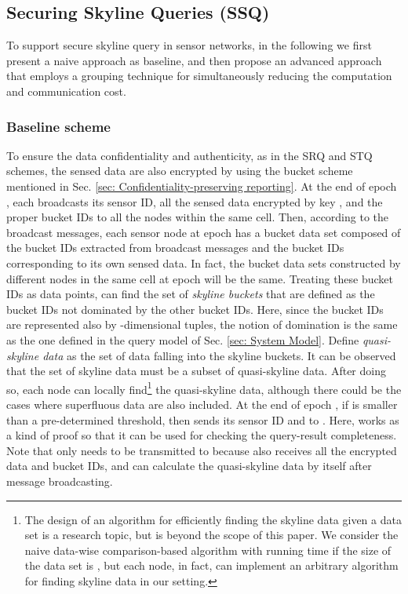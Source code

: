\documentclass[conference]{IEEEtran}
\begin{document}
\subsection{Securing Skyline Queries (SSQ)}\label{sec: Securing Skyline Queries (SSQ)}
To support secure skyline query in sensor networks, in the following we first present a naive approach as baseline, and then propose an advanced approach that employs a grouping technique for simultaneously reducing the computation and communication cost.

\subsubsection{Baseline scheme}\label{sec: Baseline scheme}
To ensure the data confidentiality and authenticity, as in the SRQ and STQ schemes, the sensed data are also encrypted by using the bucket scheme mentioned in Sec. \ref{sec: Confidentiality-preserving reporting}. At the end of epoch , each  broadcasts its sensor ID, all the sensed data encrypted by key , and the proper bucket IDs to all the nodes within the same cell. Then, according to the broadcast messages, each sensor node  at epoch  has a bucket data set composed of the bucket IDs extracted from broadcast messages and the bucket IDs corresponding to its own sensed data. In fact, the bucket data sets constructed by different nodes in the same cell at epoch  will be the same. Treating these bucket IDs as data points,  can find the set  of \emph{skyline buckets} that are defined as the bucket IDs not dominated by the other bucket IDs. Here, since the bucket IDs are represented also by -dimensional tuples, the notion of domination is the same as the one defined in the query model of Sec. \ref{sec: System Model}. Define \emph{quasi-skyline data} as the set of data falling into the skyline buckets. It can be observed that the set of skyline data must be a subset of quasi-skyline data. After doing so, each node can locally find\footnote{The design of an algorithm for efficiently finding the skyline data given a data set is a research topic, but is beyond the scope of this paper. We consider the naive data-wise comparison-based algorithm with running time  if the size of the data set is , but each node, in fact, can implement an arbitrary algorithm for finding skyline data in our setting.} the quasi-skyline data, although there could be the cases where superfluous data are also included. At the end of epoch , if  is smaller than a pre-determined threshold, then  sends its sensor ID and  to . Here,  works as a kind of proof so that it can be used for checking the query-result completeness. Note that only  needs to be transmitted to  because  also receives all the encrypted data and bucket IDs, and can calculate the quasi-skyline data by itself after message broadcasting.
\end{document}

